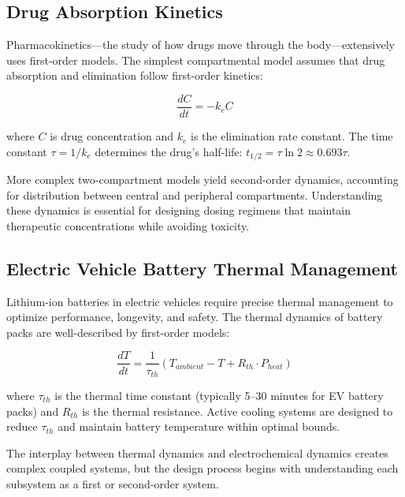 \subsection{Drug Absorption Kinetics}

Pharmacokinetics---the study of how drugs move through the body---extensively uses first-order models. The simplest compartmental model assumes that drug absorption and elimination follow first-order kinetics:

\begin{equation}
\frac{dC}{dt} = -k_e C
\end{equation}

where $C$ is drug concentration and $k_e$ is the elimination rate constant. The time constant $\tau = 1/k_e$ determines the drug's half-life: $t_{1/2} = \tau \ln 2 \approx 0.693\tau$.

More complex two-compartment models yield second-order dynamics, accounting for distribution between central and peripheral compartments. Understanding these dynamics is essential for designing dosing regimens that maintain therapeutic concentrations while avoiding toxicity.

\subsection{Electric Vehicle Battery Thermal Management}

Lithium-ion batteries in electric vehicles require precise thermal management to optimize performance, longevity, and safety. The thermal dynamics of battery packs are well-described by first-order models:

\begin{equation}
\frac{dT}{dt} = \frac{1}{\tau_{th}}\left(T_{ambient} - T + R_{th} \cdot P_{heat}\right)
\end{equation}

where $\tau_{th}$ is the thermal time constant (typically 5--30 minutes for EV battery packs) and $R_{th}$ is the thermal resistance. Active cooling systems are designed to reduce $\tau_{th}$ and maintain battery temperature within optimal bounds.

The interplay between thermal dynamics and electrochemical dynamics creates complex coupled systems, but the design process begins with understanding each subsystem as a first or second-order system.

